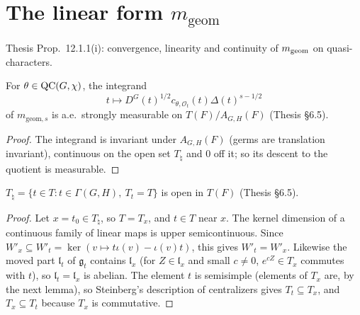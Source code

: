 \chapter{\texorpdfstring{The linear form $m_{\mathrm{geom}}$}{The linear form m geom}}
\label{chap:mgeom}
Thesis Prop.~12.1.1(i): convergence, linearity and continuity of $m_{\mathrm{geom}}$ on quasi-characters.

\begin{lemma}
\label{aestronglyMeasurable_torusFn_of_mem_QC}
\leanok
{}
For $\theta\in\mathrm{QC}(G,\chi)$, the integrand \[ t\mapsto D^G(t)^{1/2}c_{\theta,\mathcal O_t}(t)\Delta(t)^{s-1/2} \] of
$m_{\mathrm{geom},s}$ is a.e.\ strongly measurable on $T(F)/A_{G,H}(F)$ (Thesis \S6.5).
\end{lemma}
\begin{proof}
\leanok
{}
The integrand is invariant under $A_{G,H}(F)$ (germs are translation invariant), continuous on the open set $T_\natural$ and $0$ off it; so its descent to the quotient is measurable.
\end{proof}

\begin{lemma}
\label{isOpen_torusNat}
\leanok
{}
$T_\natural=\{t\in T: t\in\Gamma(G,H),\ T_t=T\}$ is open in $T(F)$ (Thesis \S6.5).
\end{lemma}
\begin{proof}
\leanok
{}
Let $x=t_0\in T_\natural$, so $T=T_x$, and $t\in T$ near $x$. The kernel dimension of a continuous family of linear maps is upper semicontinuous. Since $W'_x\subseteq W'_t=\ker(v\mapsto t\iota(v)-\iota(v)t)$, this gives $W'_t=W'_x$. Likewise the moved part $\mathfrak l_t$ of $\mathfrak g_t$ contains $\mathfrak l_x$ (for $Z\in\mathfrak l_x$ and small $c\neq0$, $e^{cZ}\in T_x$ commutes with $t$), so $\mathfrak l_t=\mathfrak l_x$ is abelian. The element $t$ is semisimple (elements of $T_x$ are, by the next lemma), so Steinberg's description of centralizers gives $T_t\subseteq T_x$, and $T_x\subseteq T_t$ because $T_x$ is commutative.
\end{proof}

